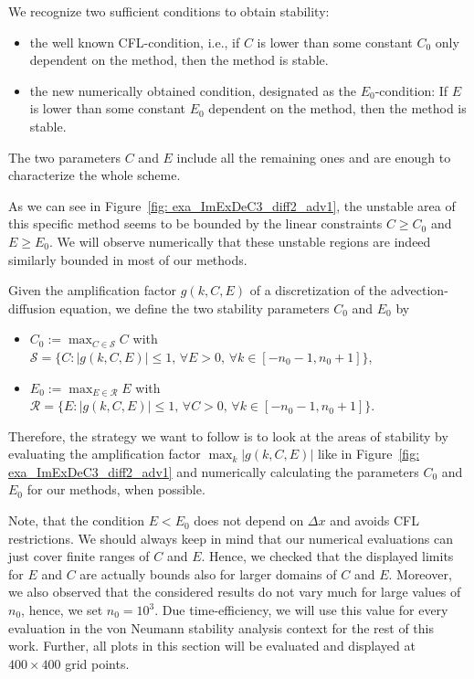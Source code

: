 \begin{example}
	We recognize two sufficient conditions to obtain stability:
	\begin{itemize}
		\item the well known CFL-condition, i.e., if $C$ is lower than some constant $C_0$ only dependent on the method, then the method is stable.
		\item the new numerically obtained condition, designated as the $E_0$-condition: If $E$ is lower than some constant $E_0$ dependent on the method, then the method is stable.
	\end{itemize}	
	The two parameters $C$ and $E$ include all the remaining ones and are enough to characterize the whole scheme.
\end{example}

As we can see in Figure~\ref{fig: exa_ImExDeC3_diff2_adv1}, the unstable area of this specific method seems to be bounded by the linear constraints $C\geq C_0$ and $E\geq E_0$. We will observe numerically that these unstable regions are indeed similarly bounded in most of our methods.
\begin{definition}
	Given the amplification factor $g(k,C,E)$ of a discretization of the advection-diffusion equation, we define the two stability parameters $C_0$ and $E_0$ by
	\begin{itemize}
		\item $C_0:=\max_{C\in \mathcal{S}} C$ with $\mathcal{S}=\lbrace C: \lvert g(k,C,E)\rvert \leq 1, \, \forall E>0, \,\forall k \in [-n_0-1,n_0+1] \rbrace$,
		\item $E_0:=\max_{E\in \mathcal{R}}E$ with $\mathcal{R}= \lbrace E: \lvert g(k,C,E)\rvert \leq 1,\, \forall C>0,\,\forall k \in [-n_0-1,n_0+1]\rbrace .$
	\end{itemize}
\end{definition}
Therefore, the strategy we want to follow is to look at the areas of stability by evaluating the amplification factor $\max_k |g(k,C,E)|$ like in Figure~\ref{fig: exa_ImExDeC3_diff2_adv1} and numerically calculating the parameters $C_0$ and $E_0$ for our methods, when possible.

Note, that the condition $E<E_0$ does not depend on $\Delta x$ and avoids CFL restrictions. We should always keep in mind that our numerical evaluations can just cover finite ranges of $C$ and $E$. 
Hence, we checked that the displayed limits for $E$ and $C$ are actually bounds also for larger domains of $C$ and $E$.
Moreover, we also observed that the considered results do not vary much for large values of $n_0$, hence, we set $n_0=10^3$. Due time-efficiency, we will use this value for every evaluation in the von Neumann stability analysis context for the rest of this work. Further, all plots in this section will be evaluated and displayed at $400\times 400$ grid points.
